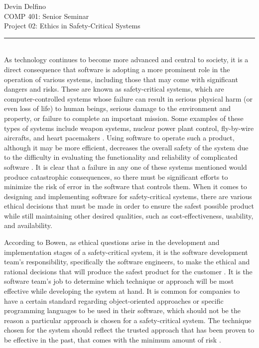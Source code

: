 \documentclass[12pt]{article}
\begin{document}
  \noindent
  Devin Delfino\\
  COMP 401: Senior Seminar\\
  Project 02: Ethics in Safety-Critical Systems\\
  \rule{\textwidth}{1pt}\\

  As technology continues to become more advanced and central to society, it is a direct consequence that software is adopting a more prominent role in the operation of various systems, including those that may come with significant dangers and risks. These are known as safety-critical systems, which are computer-controlled systems whose failure can result in serious physical harm (or even loss of life) to human beings, serious damage to the environment and property, or failure to complete an important mission. Some examples of these types of systems include weapon systems, nuclear power plant control, fly-by-wire aircrafts, and heart pacemakers \cite{ref2}. Using software to operate such a product, although it may be more efficient, decreases the overall safety of the system due to the difficulty in evaluating the functionality and reliability of complicated software \cite{ref1}. It is clear that a failure in any one of these systems mentioned would produce catastrophic consequences, so there must be significant efforts to minimize the risk of error in the software that controls them. When it comes to designing and implementing software for safety-critical systems, there are various ethical decisions that must be made in order to ensure the safest possible product while still maintaining other desired qualities, such as cost-effectiveness, usability, and availability.

  According to Bowen, as ethical questions arise in the development and implementation stages of a safety-critical system, it is the software development team's responsibility, specifically the software engineers, to make the ethical and rational decisions that will produce the safest product for the customer \cite{ref1}. It is the software team's job to determine which technique or approach will be most effective while developing the system at hand. It is common for companies to have a certain standard regarding object-oriented approaches or specific programming languages to be used in their software, which should not be the reason a particular approach is chosen for a safety-critical system. The technique chosen for the system should reflect the trusted approach that has been proven to be effective in the past, that comes with the minimum amount of risk \cite{ref1}.
\end{document}
